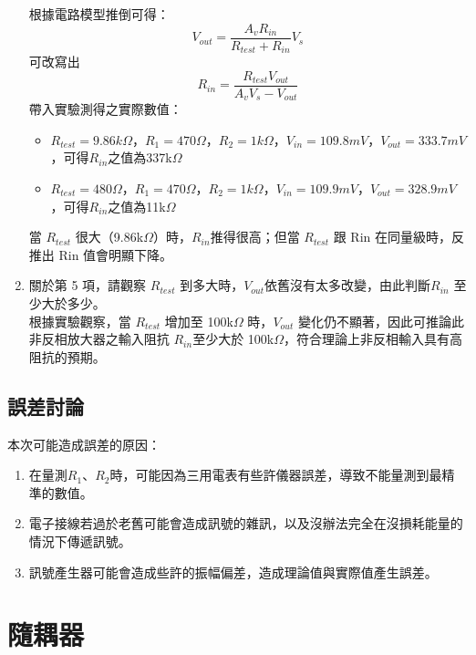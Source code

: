 \documentclass[12pt,a4paper]{article}
\begin{document}
\begin{CJK}{UTF8}{bkai}
\begin{enumerate}
根據電路模型推倒可得：
\begin{equation}
    V_{out}=\frac{A_vR_{in}}{R_{test}+R_{in}}V_s
\end{equation}
可改寫出
\begin{equation}
    R_{in}=\frac{R_{test}V_{out}}{A_vV_s-V_{out}}
\end{equation}
帶入實驗測得之實際數值：
\begin{itemize}
    \item $R_{test}=9.86k\Omega$，$R_1= 470 \Omega$，$R_2=1k \Omega$，$V_{in}=109.8mV$，$V_{out}=333.7 mV$，可得$R_{in}$之值為337k$\Omega$
    \item $R_{test}=480 \Omega$，$R_1= 470 \Omega$，$R_2=1k \Omega$，$V_{in}=109.9mV$，$V_{out}=328.9 mV$，可得$R_{in}$之值為11k$\Omega$
\end{itemize}
當 $R_{test}$ 很大（9.86k$\Omega$）時，$R_{in} $推得很高；但當 $R_{test}$ 跟 Rin 在同量級時，反推出 Rin 值會明顯下降。

\item 關於第 5 項，請觀察 $R_{test}$ 到多大時，$V_{out} $依舊沒有太多改變，由此判斷$ R_{in}$ 至少大於多少。\\
根據實驗觀察，當 $R_{test}$ 增加至 100k$\Omega$ 時，$V_{out}$ 變化仍不顯著，因此可推論此非反相放大器之輸入阻抗 $R_{in }$至少大於 100k$\Omega$，符合理論上非反相輸入具有高阻抗的預期。

\end{enumerate}

\subsection{誤差討論}

\noindent 本次可能造成誤差的原因：
\begin{enumerate}
    \item 在量測$R_1$、$R_2$時，可能因為三用電表有些許儀器誤差，導致不能量測到最精準的數值。
    \item 電子接線若過於老舊可能會造成訊號的雜訊，以及沒辦法完全在沒損耗能量的情況下傳遞訊號。
    \item 訊號產生器可能會造成些許的振幅偏差，造成理論值與實際值產生誤差。
\end{enumerate}


\section{隨耦器}

\end{CJK}
\end{document}

